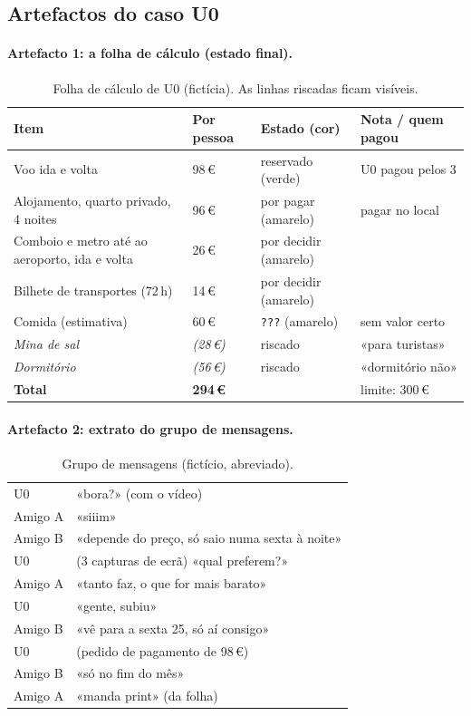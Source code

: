 \documentclass[11pt,a4paper]{article}
\begin{document}
\subsection{Artefactos do caso U0}

\paragraph{Artefacto 1: a folha de cálculo (estado final).}
\begin{table}[h]
\centering\small
\begin{tabularx}{\textwidth}{@{}p{5.6cm}p{2.3cm}p{2.6cm}L@{}}
\toprule
\textbf{Item} & \textbf{Por pessoa} & \textbf{Estado (cor)} & \textbf{Nota / quem pagou} \\ \midrule
Voo ida e volta & 98\,€ & reservado (verde) & U0 pagou pelos 3 \\
Alojamento, quarto privado, 4 noites & 96\,€ & por pagar (amarelo) & pagar no local \\
Comboio e metro até ao aeroporto, ida e volta & 26\,€ & por decidir (amarelo) & \\
Bilhete de transportes (72\,h) & 14\,€ & por decidir (amarelo) & \\
Comida (estimativa) & 60\,€ & \texttt{???} (amarelo) & sem valor certo \\
\textit{Mina de sal} & \textit{(28\,€)} & riscado & «para turistas» \\
\textit{Dormitório} & \textit{(56\,€)} & riscado & «dormitório não» \\
\textbf{Total} & \textbf{294\,€} & & limite: 300\,€ \\
\bottomrule
\end{tabularx}
\caption{Folha de cálculo de U0 (fictícia). As linhas riscadas ficam visíveis.}
\end{table}

\paragraph{Artefacto 2: extrato do grupo de mensagens.}
\begin{table}[h]
\centering\small
\begin{tabularx}{\textwidth}{@{}p{3cm}L@{}}
\toprule
U0 & «bora?» (com o vídeo) \\
Amigo A & «siiim» \\
Amigo B & «depende do preço, só saio numa sexta à noite» \\
U0 & (3 capturas de ecrã) «qual preferem?» \\
Amigo A & «tanto faz, o que for mais barato» \\
U0 & «gente, subiu» \\
Amigo B & «vê para a sexta 25, só aí consigo» \\
U0 & (pedido de pagamento de 98\,€) \\
Amigo B & «só no fim do mês» \\
Amigo A & «manda print» (da folha) \\
\bottomrule
\end{tabularx}
\caption{Grupo de mensagens (fictício, abreviado).}
\end{table}
\end{document}
